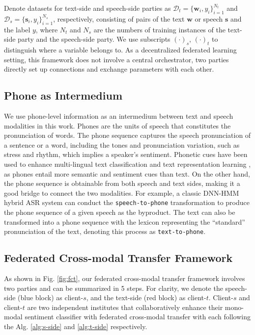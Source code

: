 \documentclass[11pt]{article}
\begin{document}
Denote datasets for text-side and speech-side parties as $\mathcal{D}_t=\{\mathbf{w}_i,y_i\}_{i=1}^{N_t}$ and $\mathcal{D}_s=\{\mathbf{s}_i,y_i\}_{i=1}^{N_s}$, respectively, consisting of pairs of the text $\mathbf{w}$ or speech $\mathbf{s}$ and the label $y$, where $N_t$ and $N_s$ are the numbers of training instances of the text-side party and the speech-side party. We use subscripts $(\cdot)_{s}$, $(\cdot)_{t}$ to distinguish where a variable belongs to. As a decentralized federated learning setting, this framework does not involve a central orchestrator, two parties directly set up connections and exchange parameters with each other.

\subsection{Phone as Intermedium}
We use phone-level information as an intermedium between text and speech modalities in this work. Phones are the units of speech that constitutes the pronunciation of words. The phone sequence captures the speech pronunciation of a sentence or a word, including the tones and pronunciation variation, such as stress and rhythm, which implies a speaker's sentiment. Phonetic cues have been used to enhance multi-lingual text classification \cite{singh2021classification} and text representation learning \cite{peng2021phonetic}, as phones entail more semantic and sentiment cues than text. On the other hand, the phone sequence is obtainable from both speech and text sides, making it a good bridge to connect the two modalities. For example, a classic DNN-HMM hybrid ASR system can conduct the \texttt{speech-to-phone} transformation to produce the phone sequence of a given speech as the byproduct. The text can also be transformed into a phone sequence with the lexicon representing the ``standard'' pronunciation of the text, denoting this process as \texttt{text-to-phone}.

\subsection{Federated Cross-modal Transfer Framework}

As shown in Fig. \ref{fig:fct}, our federated cross-modal transfer framework involves two parties and can be summarized in 5 steps. For clarity, we denote the speech-side (blue block) as client-$s$, and the text-side (red block) as client-$t$. Client-$s$ and client-$t$ are two independent institutes that collaboratively enhance their mono-modal sentiment classifier with federated cross-modal transfer with each following the Alg. \ref{alg:s-side} and \ref{alg:t-side} respectively. 
\end{document}
